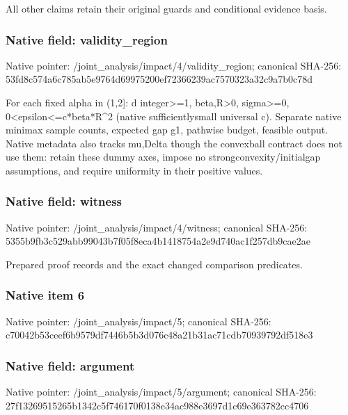 \documentclass[10pt,a4paper]{article}
\begin{document}
All other claims retain their original guards and conditional evidence basis.


\subsubsection{Native field: validity\_region}


Native pointer: /joint\_analysis/impact/4\allowbreak{}/validity\_region; canonical SHA-256: 53fd8c574a6c785ab5e9764d\allowbreak{}69975200ef72366239ac7570\allowbreak{}323a32c9a7b0c78d


For each fixed alpha in (1,2]: d integer>=1, beta,R>0, sigma>=0, 0<epsilon<=c*beta*R\textasciicircum{}2 (native sufficientlysmall universal c). Separate native minimax sample counts, expected gap g1, pathwise budget, feasible output. Native metadata also tracks mu,Delta though the convexball contract does not use them: retain these dummy axes, impose no strongconvexity/initialgap assumptions, and require uniformity in their positive values.


\subsubsection{Native field: witness}


Native pointer: /joint\_analysis/impact/4/witness; canonical SHA-256: 5355b9fb3c529abb99043b7f\allowbreak{}05f8eca4b1418754a2e9d740\allowbreak{}ac1f257db9cae2ae


Prepared proof records and the exact changed comparison predicates.


\subsubsection{Native item 6}


Native pointer: /joint\_analysis/impact/5; canonical SHA-256: c70042b53ceef6b9579df744\allowbreak{}6b5b3d076c48a21b31ac71cd\allowbreak{}b70939792df518e3



\subsubsection{Native field: argument}


Native pointer: /joint\_analysis/impact/5/argument; canonical SHA-256: 27f13269515265b1342c5f74\allowbreak{}6170f0138e34ac988e3697d1\allowbreak{}c69e363782cc4706
\end{document}
